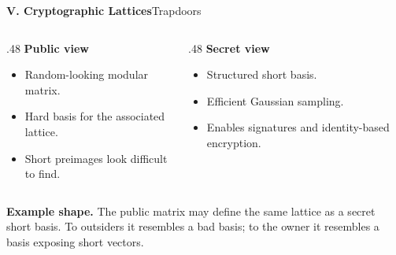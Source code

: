 \begin{frame}[shrink=8]{\textbf{V. Cryptographic Lattices}}{Trapdoors}
\begin{columns}[T,onlytextwidth]
\begin{column}{.48\textwidth}
\textcolor{TealDarkCyan}{\textbf{Public view}}
\begin{itemize}
  \item Random-looking modular matrix.
  \item Hard basis for the associated lattice.
  \item Short preimages look difficult to find.
\end{itemize}
\end{column}
\begin{column}{.48\textwidth}
\textcolor{TealDarkCyan}{\textbf{Secret view}}
\begin{itemize}
  \item Structured short basis.
  \item Efficient Gaussian sampling.
  \item Enables signatures and identity-based encryption.
\end{itemize}
\end{column}
\end{columns}
\bigskip
{}
\textbf{Example shape.}\; The public matrix may define the same lattice as a secret short basis.
To outsiders it resembles a bad basis; to the owner it resembles a basis exposing short vectors.
\end{frame}

